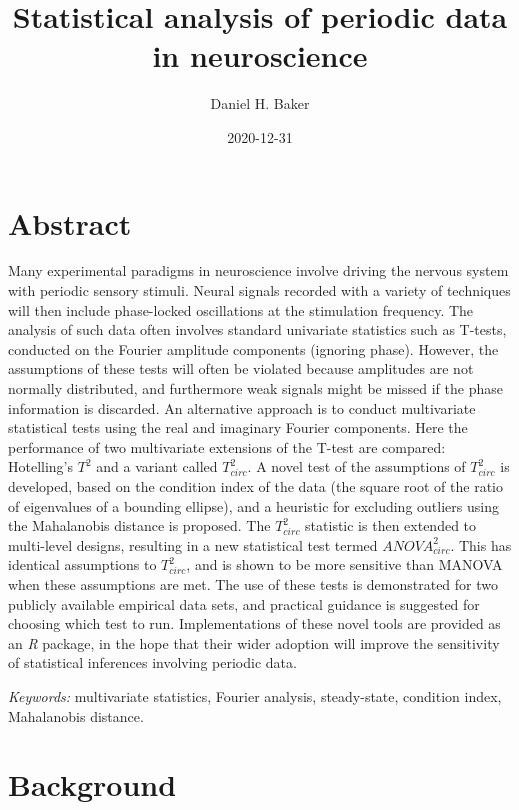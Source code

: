 \documentclass[]{article}
\title{Statistical analysis of periodic data in neuroscience}
\author{Daniel H. Baker}
\date{2020-12-31}
\begin{document}
\maketitle

\hypertarget{abstract}{%
\section{Abstract}\label{abstract}}

Many experimental paradigms in neuroscience involve driving the nervous system with periodic sensory stimuli. Neural signals recorded with a variety of techniques will then include phase-locked oscillations at the stimulation frequency. The analysis of such data often involves standard univariate statistics such as T-tests, conducted on the Fourier amplitude components (ignoring phase). However, the assumptions of these tests will often be violated because amplitudes are not normally distributed, and furthermore weak signals might be missed if the phase information is discarded. An alternative approach is to conduct multivariate statistical tests using the real and imaginary Fourier components. Here the performance of two multivariate extensions of the T-test are compared: Hotelling's \(T^2\) and a variant called \(T^2_{circ}\). A novel test of the assumptions of \(T^2_{circ}\) is developed, based on the condition index of the data (the square root of the ratio of eigenvalues of a bounding ellipse), and a heuristic for excluding outliers using the Mahalanobis distance is proposed. The \(T^2_{circ}\) statistic is then extended to multi-level designs, resulting in a new statistical test termed \(ANOVA^2_{circ}\). This has identical assumptions to \(T^2_{circ}\), and is shown to be more sensitive than MANOVA when these assumptions are met. The use of these tests is demonstrated for two publicly available empirical data sets, and practical guidance is suggested for choosing which test to run. Implementations of these novel tools are provided as an \emph{R} package, in the hope that their wider adoption will improve the sensitivity of statistical inferences involving periodic data.

\emph{Keywords:} multivariate statistics, Fourier analysis, steady-state, condition index, Mahalanobis distance.

\hypertarget{background}{%
\section{Background}\label{background}}
\end{document}
